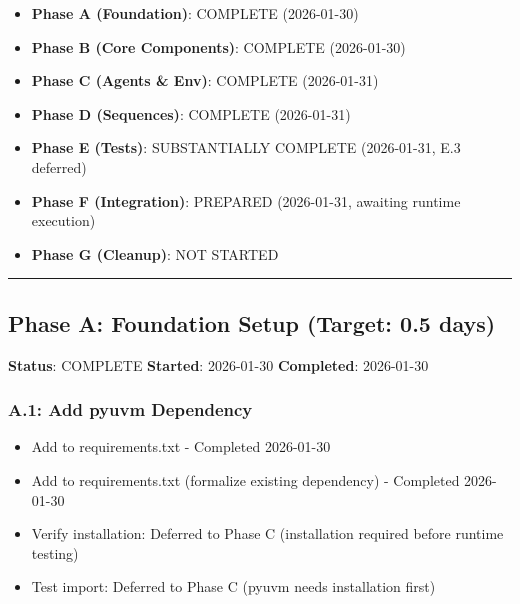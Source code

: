 \begin{record}

\begin{itemize}
\tightlist
\item
  \textbf{Phase A (Foundation)}: \ok{} COMPLETE (2026-01-30)
\item
  \textbf{Phase B (Core Components)}: \ok{} COMPLETE (2026-01-30)
\item
  \textbf{Phase C (Agents \& Env)}: \ok{} COMPLETE (2026-01-31)
\item
  \textbf{Phase D (Sequences)}: \ok{} COMPLETE (2026-01-31)
\item
  \textbf{Phase E (Tests)}: \ok{} SUBSTANTIALLY COMPLETE (2026-01-31,
  E.3 deferred)
\item
  \textbf{Phase F (Integration)}: \ok{} PREPARED (2026-01-31, awaiting
  runtime execution)
\item
  \textbf{Phase G (Cleanup)}: NOT STARTED
\end{itemize}

\begin{center}\rule{0.5\linewidth}{0.5pt}\end{center}

\end{record}

\subsection{Phase A: Foundation Setup (Target: 0.5 days)}\label{cr:status:pyuvm-migration:phase-a-foundation-setup-target-05-days}

\begin{record}

\textbf{Status}: \ok{} COMPLETE \textbf{Started}: 2026-01-30
\textbf{Completed}: 2026-01-30

\end{record}

\subsubsection{A.1: Add pyuvm Dependency}\label{cr:status:pyuvm-migration:a1-add-pyuvm-dependency}

\begin{record}

\begin{itemize}
\tightlist
\item[$\boxtimes$]
  Add  to requirements.txt - Completed 2026-01-30
\item[$\boxtimes$]
  Add  to requirements.txt (formalize existing
  dependency) - Completed 2026-01-30
\item[$\boxtimes$]
  Verify installation: Deferred to Phase C (installation required before
  runtime testing)
\item[$\boxtimes$]
  Test import: Deferred to Phase C (pyuvm needs installation first)
\end{itemize}

\end{record}


